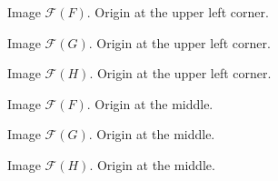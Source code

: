 \begin{minipage}{\linewidth}
  \centering
  \begin{minipage}{0.25\linewidth}
    \begin{figure}[H]
      \scalebox{0.23}{}
      \caption{Image $\mathcal{F}(F)$. Origin at the upper left corner.}
      \label{fig:02.Fhat_nc}
    \end{figure}
  \end{minipage}
  \hspace{0.05\linewidth}
  \begin{minipage}{0.25\linewidth}
    \begin{figure}[H]
      \scalebox{0.4}{}
      \caption{Image $\mathcal{F}(G)$. Origin at the upper left corner.}
      \label{fig:02.Ghat_nc}
    \end{figure}
  \end{minipage}
  \hspace{0.05\linewidth}
  \begin{minipage}{0.25\linewidth}
    \begin{figure}[H]
      \scalebox{0.4}{}
      \caption{Image $\mathcal{F}(H)$. Origin at the upper left corner.}
      \label{fig:02.Hhat_nc}
    \end{figure}
  \end{minipage}
\end{minipage}


\begin{minipage}{\linewidth}
  \centering
  \begin{minipage}{0.25\linewidth}
    \begin{figure}[H]
      \scalebox{0.4}{}
      \caption{Image $\mathcal{F}(F)$. Origin at the middle.}
      \label{fig:02.Fhat_c}
    \end{figure}
  \end{minipage}
  \hspace{0.05\linewidth}
  \begin{minipage}{0.25\linewidth}
    \begin{figure}[H]
      \scalebox{0.4}{}
      \caption{Image $\mathcal{F}(G)$. Origin at the middle.}
      \label{fig:02.Ghat_c}
    \end{figure}
  \end{minipage}
  \hspace{0.05\linewidth}
  \begin{minipage}{0.25\linewidth}
    \begin{figure}[H]
      \scalebox{0.4}{}
      \caption{Image $\mathcal{F}(H)$. Origin at the middle.}
      \label{fig:02.Hhat_c}
    \end{figure}
  \end{minipage}
\end{minipage}


